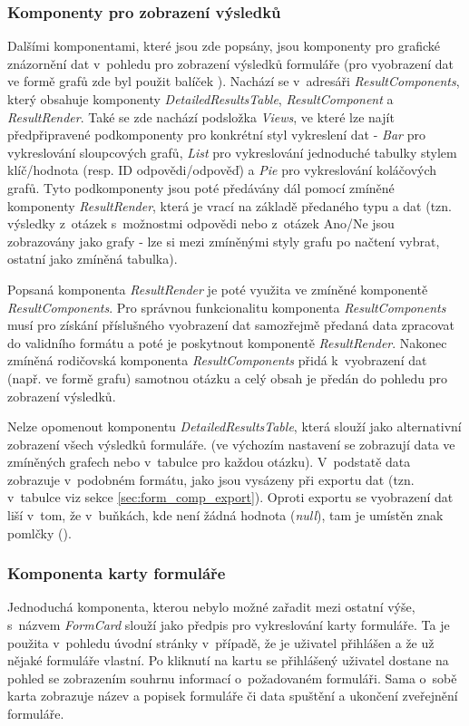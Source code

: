 		\subsubsection{Komponenty pro zobrazení výsledků} \label{sec:komp_vysledky} %
		Dalšími komponentami, které jsou zde popsány, jsou komponenty pro grafické znázornění dat v~pohledu pro zobrazení výsledků formuláře (pro vyobrazení dat ve formě grafů zde byl použit balíček ). Nachází se v~adresáři \textit{ResultComponents}, který obsahuje komponenty \textit{DetailedResultsTable}, \textit{ResultComponent} a \textit{ResultRender}. Také se zde nachází podsložka \textit{Views}, ve které lze najít předpřipravené podkomponenty pro konkrétní styl vykreslení dat - \textit{Bar} pro vykreslování sloupcových grafů, \textit{List} pro vykreslování jednoduché tabulky stylem klíč/hodnota (resp. ID odpovědi/odpověď) a \textit{Pie} pro vykreslování koláčových grafů. Tyto podkomponenty jsou poté předávány dál pomocí zmíněné komponenty \textit{ResultRender}, která je vrací na základě předaného typu a dat (tzn. výsledky z~otázek s~možnostmi odpovědi nebo z~otázek Ano/Ne jsou zobrazovány jako grafy - lze si mezi zmíněnými styly grafu po načtení vybrat, ostatní jako zmíněná tabulka).
		
		Popsaná komponenta \textit{ResultRender} je poté využita ve zmíněné komponentě \textit{ResultComponents}. Pro správnou funkcionalitu komponenta \textit{ResultComponents} musí pro získání příslušného vyobrazení dat samozřejmě předaná data zpracovat do validního formátu a poté je poskytnout komponentě \textit{ResultRender}. Nakonec zmíněná rodičovská komponenta \textit{ResultComponents} přidá k~vyobrazení dat (např. ve formě grafu) samotnou otázku a celý obsah je předán do pohledu pro zobrazení výsledků.
		
		Nelze opomenout komponentu \textit{DetailedResultsTable}, která slouží jako alternativní zobrazení všech výsledků formuláře. (ve výchozím nastavení se zobrazují data ve zmíněných grafech nebo v~tabulce pro každou otázku). V~podstatě data zobrazuje v~podobném formátu, jako jsou vysázeny při exportu dat (tzn. v~tabulce viz sekce \ref{sec:form_comp_export}). Oproti exportu se vyobrazení dat liší v~tom, že v~buňkách, kde není žádná hodnota (\textit{null}), tam je umístěn znak pomlčky (\uv{-}).
		
		\subsubsection{Komponenta karty formuláře}\label{sec:fe_komp_karta_form}
		Jednoduchá komponenta, kterou nebylo možné zařadit mezi ostatní výše, s~názvem \textit{FormCard} slouží jako předpis pro vykreslování karty formuláře. Ta je použita v~pohledu úvodní stránky v~případě, že je uživatel přihlášen a že už nějaké formuláře vlastní. Po kliknutí na kartu se přihlášený uživatel dostane na pohled se zobrazením souhrnu informací o~požadovaném formuláři. Sama o~sobě karta zobrazuje název a popisek formuláře či data spuštění a ukončení zveřejnění formuláře.
	
